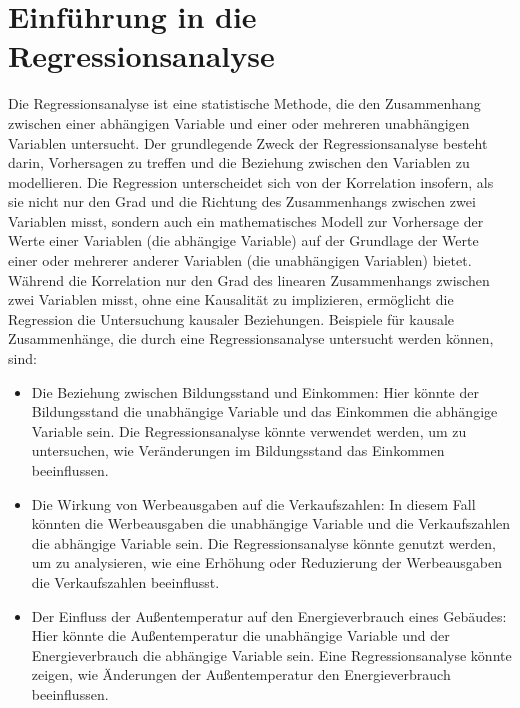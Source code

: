 \section{Einführung in die Regressionsanalyse}
Die Regressionsanalyse ist eine statistische Methode, die den Zusammenhang zwischen einer abhängigen Variable und einer oder mehreren unabhängigen Variablen untersucht.
Der grundlegende Zweck der Regressionsanalyse besteht darin, Vorhersagen zu treffen und die Beziehung zwischen den Variablen zu modellieren.
\newline \newline
Die Regression unterscheidet sich von der Korrelation insofern, als sie nicht nur den Grad und die Richtung des Zusammenhangs zwischen zwei Variablen misst, sondern auch ein mathematisches Modell zur Vorhersage der Werte einer Variablen (die abhängige Variable) auf der Grundlage der Werte einer oder mehrerer anderer Variablen (die unabhängigen Variablen) bietet.
Während die Korrelation nur den Grad des linearen Zusammenhangs zwischen zwei Variablen misst, ohne eine Kausalität zu implizieren, ermöglicht die Regression die Untersuchung kausaler Beziehungen.
\newline \newline
Beispiele für kausale Zusammenhänge, die durch eine Regressionsanalyse untersucht werden können, sind:
\begin{itemize}
    \item Die Beziehung zwischen Bildungsstand und Einkommen: Hier könnte der Bildungsstand die unabhängige Variable und das Einkommen die abhängige Variable sein.
    Die Regressionsanalyse könnte verwendet werden, um zu untersuchen, wie Veränderungen im Bildungsstand das Einkommen beeinflussen.

    \item Die Wirkung von Werbeausgaben auf die Verkaufszahlen: In diesem Fall könnten die Werbeausgaben die unabhängige Variable und die Verkaufszahlen die abhängige Variable sein.
    Die Regressionsanalyse könnte genutzt werden, um zu analysieren, wie eine Erhöhung oder Reduzierung der Werbeausgaben die Verkaufszahlen beeinflusst.

    \item Der Einfluss der Außentemperatur auf den Energieverbrauch eines Gebäudes: Hier könnte die Außentemperatur die unabhängige Variable und der Energieverbrauch die abhängige Variable sein.
    Eine Regressionsanalyse könnte zeigen, wie Änderungen der Außentemperatur den Energieverbrauch beeinflussen.
\end{itemize}

